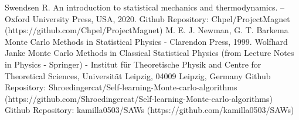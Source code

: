 \begin{thebibliography}{9}
 Swendsen R. An introduction to statistical mechanics and thermodynamics. – Oxford University Press, USA, 2020.
 Github Repository: Chpel/ProjectMagnet (https://github.com/Chpel/ProjectMagnet)
 M. E. J. Newman, G. T. Barkema Monte Carlo Methods in Statistical Physics - Clarendon Press, 1999.
 Wolfhard Janke Monte Carlo Methods in Classical Statistical Physics (from Lecture Notes in Physics - Springer) - Institut für Theoretische Physik and Centre for Theoretical Sciences, Universität Leipzig, 04009 Leipzig, Germany
 Github Repository: Shroedingercat/Self-learning-Monte-carlo-algorithms (https://github.com/Shroedingercat/Self-learning-Monte-carlo-algorithms)
 Github Repository: kamilla0503/SAWs (https://github.com/kamilla0503/SAWs)
\end{thebibliography}

